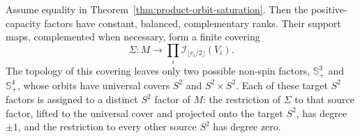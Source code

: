 \begin{lemma}\label{lem:product-support-cover}
Assume equality in Theorem~\ref{thm:product-orbit-saturation}. Then the
positive-capacity factors have constant, balanced, complementary ranks.
Their support maps, complemented when necessary, form a finite covering
\begin{equation}\label{eq:product-orbit-cover}
 \Sigma:M\longrightarrow
       \prod_i\mathcal I_{\lfloor r_i/2\rfloor}(V_i).
\end{equation}
The topology of this covering leaves only two possible non-spin factors,
$\mathbb S_+^3$ and $\mathbb S_+^4$, whose orbits have universal covers
$S^2$ and $S^2\times S^2$. Each of these target $S^2$ factors is
assigned to a distinct $S^2$ factor of $M$: the restriction of $\Sigma$
to that source factor, lifted to the universal cover and projected onto
the target $S^2$, has degree $\pm1$, and the restriction to every other
source $S^2$ has degree zero.
\end{lemma}
